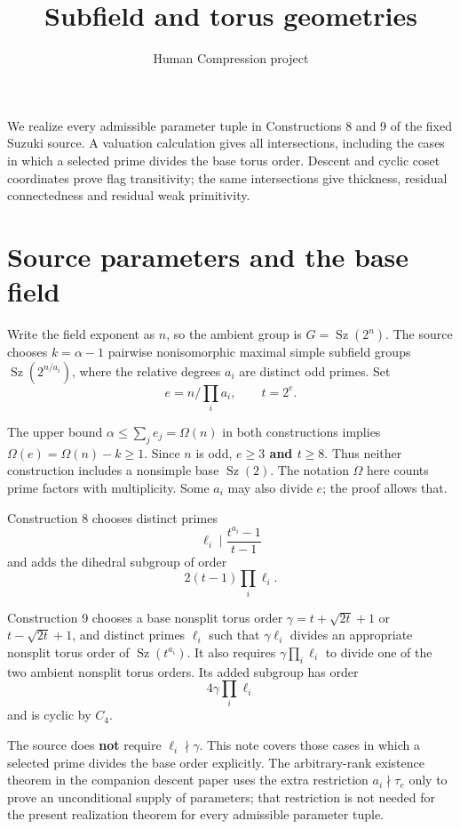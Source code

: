 \documentclass[11pt,a4paper]{article}
\title{Subfield and torus geometries}
\author{Human Compression project}\date{}
\begin{document}
\maketitle
We realize every admissible parameter tuple in Constructions 8 and 9 of
the fixed Suzuki source. A valuation calculation gives all
intersections, including the cases in which a selected prime divides the
base torus order. Descent and cyclic coset coordinates prove flag
transitivity; the same intersections give thickness, residual
connectedness and residual weak primitivity.

\section{Source parameters and the base
field}\label{source-parameters-and-the-base-field}

Write the field exponent as \(n\), so the ambient group is
\(G=\operatorname{Sz}(2^n)\). The source chooses \(k=\alpha-1\) pairwise
nonisomorphic maximal simple subfield groups
\(\operatorname{Sz}(2^{n/a_i})\), where the relative degrees \(a_i\) are
distinct odd primes. Set \[
e=n/\prod_i a_i,\qquad t=2^e.
\]

The upper bound \(\alpha\le\sum_j e_j=\Omega(n)\) in both constructions
implies \(\Omega(e)=\Omega(n)-k\ge1\). Since \(n\) is odd,
\textbf{\(e\ge3\) and \(t\ge8\)}. Thus neither construction includes a
nonsimple base \(\operatorname{Sz}(2)\). The notation \(\Omega\) here
counts prime factors with multiplicity. Some \(a_i\) may also divide
\(e\); the proof allows that.

Construction 8 chooses distinct primes \[
\ell_i\mid\frac{t^{a_i}-1}{t-1}
\] and adds the dihedral subgroup of order \[
2(t-1)\prod_i\ell_i.
\]

Construction 9 chooses a base nonsplit torus order
\(\gamma=t+\sqrt{2t}+1\) or \(t-\sqrt{2t}+1\), and distinct primes
\(\ell_i\) such that \(\gamma\ell_i\) divides an appropriate nonsplit
torus order of \(\operatorname{Sz}(t^{a_i})\). It also requires
\(\gamma\prod_i\ell_i\) to divide one of the two ambient nonsplit torus
orders. Its added subgroup has order \[
4\gamma\prod_i\ell_i
\] and is cyclic by \(C_4\).

The source does \textbf{not} require \(\ell_i\nmid\gamma\). This note
covers those cases in which a selected prime divides the base order
explicitly. The arbitrary-rank existence theorem in the companion
descent paper uses the extra restriction \(a_i\nmid\tau_e\) only to
prove an unconditional supply of parameters; that restriction is not
needed for the present realization theorem for every admissible
parameter tuple.
\end{document}
